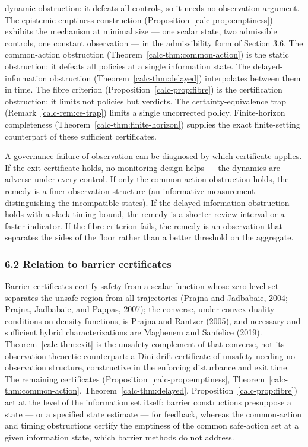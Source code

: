 \documentclass[10pt,twocolumn]{article}
\theoremstyle{definition}
\begin{document}
dynamic obstruction: it defeats all controls, so it needs no observation
argument. The epistemic-emptiness construction (Proposition~\ref{calc-prop:emptiness}) exhibits the
mechanism at minimal size --- one scalar state, two admissible controls,
one constant observation --- in the admissibility form of Section 3.6. The common-action obstruction (Theorem~\ref{calc-thm:common-action}) is the static
obstruction: it defeats all policies at a single information state. The
delayed-information obstruction (Theorem~\ref{calc-thm:delayed}) interpolates between them in
time. The fibre criterion (Proposition~\ref{calc-prop:fibre}) is the certification obstruction:
it limits not policies but verdicts. The certainty-equivalence trap
(Remark~\ref{calc-rem:ce-trap}) limits a single uncorrected policy. Finite-horizon completeness
(Theorem~\ref{calc-thm:finite-horizon}) supplies the exact finite-setting
counterpart of these sufficient certificates.

A governance failure of observation can be diagnosed by which
certificate applies. If the exit certificate holds, no monitoring design
helps --- the dynamics are adverse under every control. If only the
common-action obstruction holds, the remedy is a finer observation
structure (an informative measurement distinguishing the incompatible
states). If the delayed-information obstruction holds with a slack
timing bound, the remedy is a shorter review interval or a faster
indicator. If the fibre criterion fails, the remedy is an observation
that separates the sides of the floor rather than a better threshold on
the aggregate.

\subsubsection{6.2 Relation to barrier
certificates}\label{calc-relation-to-barrier-certificates}

Barrier certificates certify safety from a scalar function whose zero level set separates the unsafe region from all trajectories (Prajna and Jadbabaie, 2004; Prajna, Jadbabaie, and Pappas, 2007); the converse, under convex-duality conditions on density functions, is Prajna and Rantzer (2005), and necessary-and-sufficient hybrid characterizations are Maghenem and Sanfelice (2019). Theorem~\ref{calc-thm:exit} is the unsafety complement of that converse, not its observation-theoretic counterpart: a Dini-drift certificate of unsafety needing no observation structure, constructive in the enforcing disturbance and exit time. The remaining certificates (Proposition~\ref{calc-prop:emptiness}, Theorem~\ref{calc-thm:common-action}, Theorem~\ref{calc-thm:delayed}, Proposition~\ref{calc-prop:fibre}) act at the level of the information set itself: barrier constructions presuppose a state --- or a specified state estimate --- for feedback, whereas the common-action and timing obstructions certify the emptiness of the common safe-action set at a given information state, which barrier methods do not address.
\end{document}
